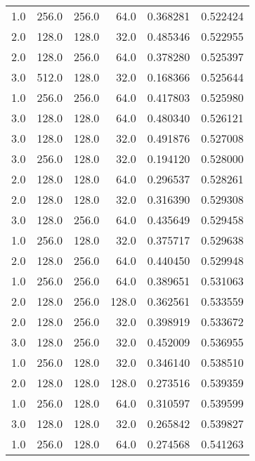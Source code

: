 \begin{longtable}{rrrrrr}
        1.0 &     256.0 &       256.0 &     64.0 &      0.368281 &    0.522424 \\
        2.0 &     128.0 &       128.0 &     32.0 &      0.485346 &    0.522955 \\
        2.0 &     128.0 &       256.0 &     64.0 &      0.378280 &    0.525397 \\
        3.0 &     512.0 &       128.0 &     32.0 &      0.168366 &    0.525644 \\
        1.0 &     256.0 &       256.0 &     64.0 &      0.417803 &    0.525980 \\
        3.0 &     128.0 &       128.0 &     64.0 &      0.480340 &    0.526121 \\
        3.0 &     128.0 &       128.0 &     32.0 &      0.491876 &    0.527008 \\
        3.0 &     256.0 &       128.0 &     32.0 &      0.194120 &    0.528000 \\
        2.0 &     128.0 &       128.0 &     64.0 &      0.296537 &    0.528261 \\
        2.0 &     128.0 &       128.0 &     32.0 &      0.316390 &    0.529308 \\
        3.0 &     128.0 &       256.0 &     64.0 &      0.435649 &    0.529458 \\
        1.0 &     256.0 &       128.0 &     32.0 &      0.375717 &    0.529638 \\
        2.0 &     128.0 &       256.0 &     64.0 &      0.440450 &    0.529948 \\
        1.0 &     256.0 &       256.0 &     64.0 &      0.389651 &    0.531063 \\
        2.0 &     128.0 &       256.0 &    128.0 &      0.362561 &    0.533559 \\
        2.0 &     128.0 &       256.0 &     32.0 &      0.398919 &    0.533672 \\
        3.0 &     128.0 &       256.0 &     32.0 &      0.452009 &    0.536955 \\
        1.0 &     256.0 &       128.0 &     32.0 &      0.346140 &    0.538510 \\
        2.0 &     128.0 &       128.0 &    128.0 &      0.273516 &    0.539359 \\
        1.0 &     256.0 &       128.0 &     64.0 &      0.310597 &    0.539599 \\
        3.0 &     128.0 &       128.0 &     32.0 &      0.265842 &    0.539827 \\
        1.0 &     256.0 &       128.0 &     64.0 &      0.274568 &    0.541263 \\

\end{longtable}
